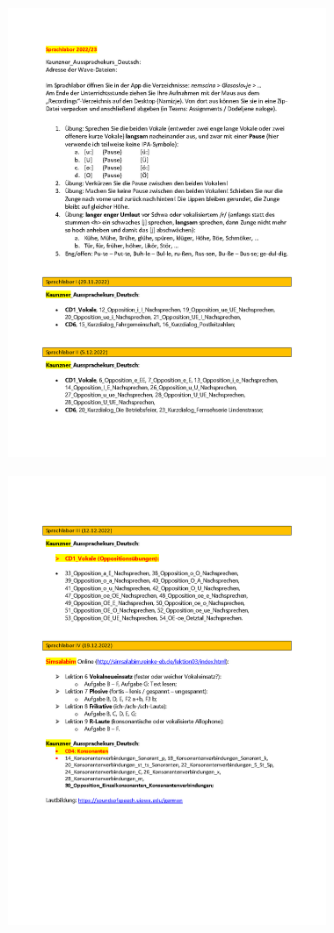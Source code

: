 \documentclass[
  letterpaper,
]{scrbook}
\begin{document}
\includegraphics[width=3.31in,height=\textheight]{./pictures/sprachlabor/Sprachlaboruebungen_2022_Page1.png}

\includegraphics[width=3.31in,height=\textheight]{./pictures/sprachlabor/Sprachlaboruebungen_2022_Page2.png}
\end{document}
